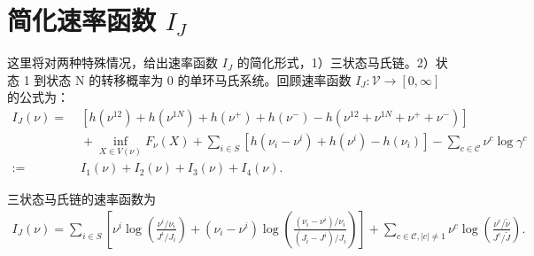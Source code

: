 \section{简化速率函数 $I_J$}\label{appendix:threestate}
这里将对两种特殊情况，给出速率函数 $I_J$ 的简化形式，1）三状态马氏链。2）状态 1 到状态 N 的转移概率为 0 的单环马氏系统。回顾速率函数 $I_J:\mathcal{V}\to[0,\infty]$ 的公式为：
\begin{equation*}\label{ratefunction1}
	\begin{split}
		I_J(\nu) =&\; \left[h\left(\nu^{12}\right)+h\left(\nu^{1N}\right)
		+h\left(\nu^+\right)+h\left(\nu^-\right)-h\left(\nu^{12}+\nu^{1N}+\nu^++\nu^-\right)\right] \\
		&\;+\inf_{X\in V(\nu)}F_{\nu}(X)+\sum_{i\in S}\left[ h\left(\nu_i-\nu^i\right)+h\left(\nu^i\right)
		-h\left(\nu_i\right)\right]-\sum_{c\in\mathcal{C}}\nu^c\log\gamma^c\\
		:=&\;I_1(\nu)+I_2(\nu)+I_3(\nu)+I_4(\nu).
	\end{split}
\end{equation*}
\begin{proposition}
三状态马氏链的速率函数为
\begin{align*}
I_J(\nu) =
\sum_{i\in S} \left[\nu^{i}\log \left(\frac{\nu^{i}/\nu_i}{J^i/J_i}\right) + (\nu_i - \nu^i)\log \left(\frac{(\nu_i - \nu^i)/\nu_i}{(J_i - J^i)/J_i} \right)
\right]
+ \sum_{c \in \mathcal{C}, |c|\neq 1} \nu^{c} \log \left(\frac{\nu^{c}/\tilde{\nu}}{J^c/\tilde{J}}\right).
\end{align*}
\end{proposition}

